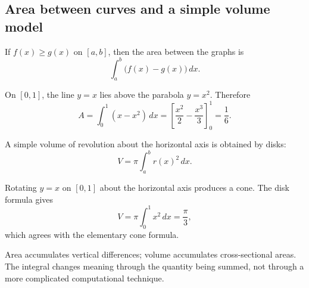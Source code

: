 \subsection{Area between curves and a simple volume model}

If \(f(x)\ge g(x)\) on \([a,b]\), then the area between the graphs is
\[
\int_a^b \bigl(f(x)-g(x)\bigr)\,dx.
\]

\begin{examplebox}
On \([0,1]\), the line \(y=x\) lies above the parabola \(y=x^2\). Therefore
\[
A=\int_0^1 (x-x^2)\,dx
=\left[\frac{x^2}{2}-\frac{x^3}{3}\right]_0^1
=\frac16.
\]
\end{examplebox}

A simple volume of revolution about the horizontal axis is obtained by disks:
\[
V=\pi\int_a^b r(x)^2\,dx.
\]

\begin{examplebox}
Rotating \(y=x\) on \([0,1]\) about the horizontal axis produces a cone. The disk formula gives
\[
V=\pi\int_0^1 x^2\,dx=\frac{\pi}{3},
\]
which agrees with the elementary cone formula.
\end{examplebox}

\begin{interpretationbox}
Area accumulates vertical differences; volume accumulates cross-sectional areas. The integral changes meaning through the quantity being summed, not through a more complicated computational technique.
\end{interpretationbox}
